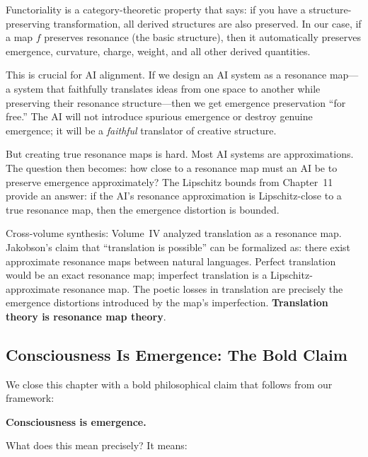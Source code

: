 \begin{interpretation}
Functoriality is a category-theoretic property that says: if you have a
structure-preserving transformation, all derived structures are also preserved.
In our case, if a map $f$ preserves resonance (the basic structure), then it
automatically preserves emergence, curvature, charge, weight, and all other
derived quantities.

This is crucial for AI alignment. If we design an AI system as a resonance
map---a system that faithfully translates ideas from one space to another
while preserving their resonance structure---then we get emergence preservation
``for free.'' The AI will not introduce spurious emergence or destroy genuine
emergence; it will be a \emph{faithful} translator of creative structure.

But creating true resonance maps is hard. Most AI systems are approximations.
The question then becomes: how close to a resonance map must an AI be to
preserve emergence approximately? The Lipschitz bounds from Chapter~11 provide
an answer: if the AI's resonance approximation is Lipschitz-close to a true
resonance map, then the emergence distortion is bounded.

Cross-volume synthesis: Volume~IV analyzed translation as a resonance map.
Jakobson's claim that ``translation is possible'' can be formalized as: there
exist approximate resonance maps between natural languages. Perfect
translation would be an exact resonance map; imperfect translation is a
Lipschitz-approximate resonance map. The poetic losses in translation are
precisely the emergence distortions introduced by the map's imperfection.
\textbf{Translation theory is resonance map theory}.
\end{interpretation}

\subsection{Consciousness Is Emergence: The Bold Claim}

We close this chapter with a bold philosophical claim that follows from our
framework:

\begin{center}
\textbf{Consciousness is emergence.}
\end{center}

What does this mean precisely? It means:

